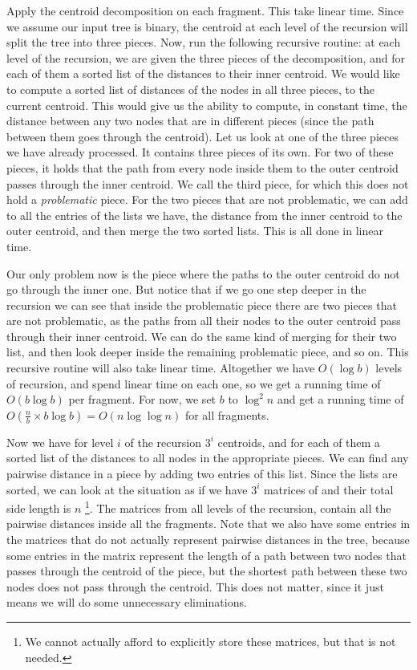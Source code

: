 \documentclass[11pt,a4paper]{article}
\theoremstyle{definition}
\theoremstyle{remark}
\begin{document}
Apply the centroid decomposition on each fragment. This take linear time. Since we assume our input tree is binary, the centroid at each level of the recursion will split the tree into three pieces. Now, run the following recursive routine: at each level of the recursion, we are given the three pieces of the decomposition, and for each of them a sorted list of the distances to their inner centroid. We would like to compute a sorted list of distances of the nodes in all three pieces, to the current centroid. This would give us the ability to compute, in constant time, the distance between any two nodes that are in different pieces (since the path between them goes through the centroid). Let us look at one of the three pieces we have already processed. It contains three pieces of its own. For two of these pieces, it holds that the path from every node inside them to the outer centroid passes through the inner centroid. We call the third piece, for which this does not hold a \textit{problematic} piece. For the two pieces that are not problematic, we can add to all the entries of the lists we have, the distance from the inner centroid to the outer centroid, and then merge the two sorted lists. This is all done in linear time.

Our only problem now is the piece where the paths to the outer centroid do not go through the inner one. But notice that if we go one step deeper in the recursion we can see that inside the problematic piece there are two pieces that are not problematic, as the paths from all their nodes to the outer centroid pass through their inner centroid. We can do the same kind of merging for their two list, and then look deeper inside the remaining problematic piece, and so on. This recursive routine will also take linear time. Altogether we have $O(\log b)$ levels of recursion, and spend linear time on each one, so we get a running time of $O(b \log b)$ per fragment. For now, we set $b$ to $\log ^2 n$ and get a running time of $O(\frac{n}{b} \times b\log b) = O(n \log \log n)$ for all fragments.

Now we have for level $i$ of the recursion $3^i$ centroids, and for each of them a sorted list of the distances to all nodes in the appropriate pieces. We can find any pairwise distance in a piece by adding two entries of this list. Since the lists are sorted, we can look at the situation as if we have $3^i$ matrices of and their total side length is $n$ \footnote{We cannot actually afford to explicitly store these matrices, but that is not needed.}. The matrices from all levels of the recursion, contain all the pairwise distances inside all the fragments. Note that we also have some entries in the matrices that do not actually represent pairwise distances in the tree, because some entries in the matrix represent the length of a path between two nodes that passes through the centroid of the piece, but the shortest path between these two nodes does not pass through the centroid. This does not matter, since it just means we will do some unnecessary eliminations.
\end{document}
